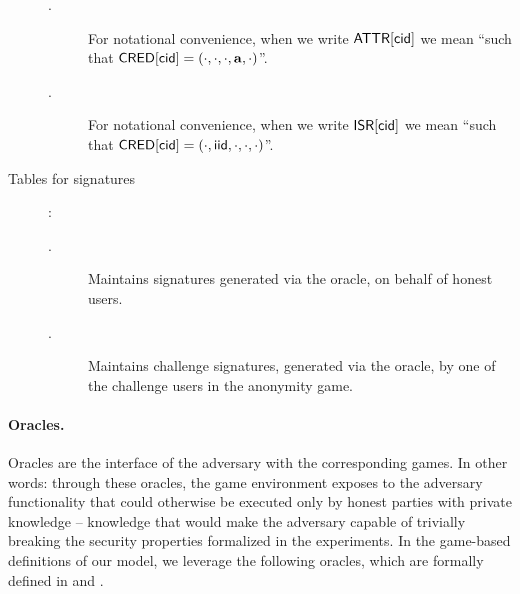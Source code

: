 \begin{description}
\begin{description}
  \item[\ATTR.] For notational convenience, when we write $\mathsf{ATTR}[\mathsf{cid}]$ we mean
    ``\attrs such that $\mathsf{CRED}[\mathsf{cid}] = (\cdot, \cdot, \cdot, \mathbf{a}, \cdot)$''.
  \item[\ISR.] For notational convenience, when we write $\mathsf{ISR}[\mathsf{cid}]$ we mean
    ``\iid such that $\mathsf{CRED}[\mathsf{cid}] = (\cdot, \mathsf{iid}, \cdot, \cdot, \cdot)$''.
  \end{description}
\item[Tables for signatures]:
  \begin{description}
  \item[\SIG.] Maintains signatures generated via the \SIGN oracle, on behalf
    of honest users.
  \item[\CSIG.] Maintains challenge signatures, generated via the \CHALb oracle,
    by one of the challenge users in the anonymity game.
  \end{description}
\end{description}

\paragraph{Oracles.} %
Oracles are the interface of the adversary with the corresponding games. In
other words: through these oracles, the game environment exposes to the adversary
functionality that could otherwise be executed only by honest parties with
private knowledge -- knowledge that would make the adversary capable of
trivially breaking the security properties formalized in the experiments.
In the game-based definitions of our \UAS model, we leverage the following
oracles, which are formally defined in  and
. 

